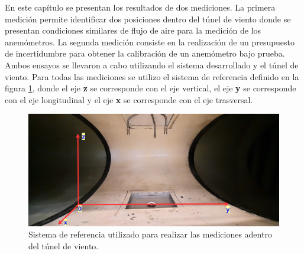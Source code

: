 



En este capítulo se presentan los resultados de dos mediciones. La primera medición permite identificar dos posiciones dentro del túnel de viento donde se presentan condiciones similares de flujo de aire para la medición de los anemómetros. La segunda medición consiste en la realización de un presupuesto de incertidumbre para obtener la calibración de un anemómetro bajo prueba. Ambos ensayos se llevaron a cabo utilizando el sistema desarrollado y el túnel de viento. Para todas las mediciones se utilizo el sistema de referencia definido en la figura \ref{fig:sisReferenciaZmed}, donde el eje \textbf{z} se corresponde con el eje vertical, el eje \textbf{y} se corresponde con el eje longitudinal y el eje \textbf{x} se corresponde con el eje trasversal.

\begin{figure}[H]
    \centering
    \includegraphics[width=0.9\linewidth]{Figuras/resultados/sisReferenciaZmed.png}
    \caption{Sistema de referencia utilizado para realizar las mediciones adentro del túnel de viento.}
    \label{fig:sisReferenciaZmed}
\end{figure}
